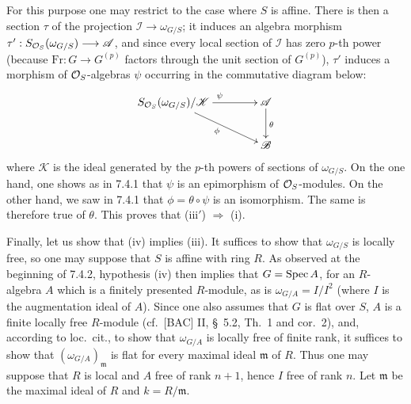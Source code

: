 For this purpose one may restrict to the case where $S$ is affine. There is then a section $\tau$ of the projection $\mathscr I\to\omega_{G/S}$; it induces an algebra morphism $\tau':S_{\mathcal{O}_S}(\omega_{G/S})\longrightarrow\mathscr A$, and since every local section of $\mathscr I$ has zero $p$-th power (because $\mathrm{Fr}:G\to G^{(p)}$ factors through the unit section of $G^{(p)}$), $\tau'$ induces a morphism of $\mathcal{O}_S$-algebras $\psi$ occurring in the commutative diagram below:
\[
\xymatrix@C=4em{S_{\OS}(\omega_{G/S})/\mathscr K\ar[r]^\psi\ar[dr]_\phi&\mathscr A\ar[d]^\theta\\&\mathscr B}
\]
where $\mathscr K$ is the ideal generated by the $p$-th powers of sections of $\omega_{G/S}$. On the one hand, one shows as in 7.4.1 that $\psi$ is an epimorphism of $\mathcal{O}_S$-modules. On the other hand, we saw in 7.4.1 that $\phi=\theta\circ\psi$ is an isomorphism. The same is therefore true of $\theta$. This proves that (iii$'$) $\Rightarrow$ (i).

Finally, let us show that (iv) implies (iii). It suffices to show that $\omega_{G/S}$ is locally free, so one may suppose that $S$ is affine with ring $R$. As observed at the beginning of 7.4.2, hypothesis (iv) then implies that $G=\operatorname{Spec} A$, for an $R$-algebra $A$ which is a finitely presented $R$-module, as is $\omega_{G/A}=I/I^2$ (where $I$ is the augmentation ideal of $A$). Since one also assumes that $G$ is flat over $S$, $A$ is a finite locally free $R$-module (cf.\ [BAC] II, \S~5.2, Th.\ 1 and cor.\ 2), and, according to loc.\ cit., to show that $\omega_{G/A}$ is locally free of finite rank, it suffices to show that $(\omega_{G/A})_{\mathfrak m}$ is flat for every maximal ideal $\mathfrak m$ of $R$. Thus one may suppose that $R$ is local and $A$ free of rank $n+1$, hence $I$ free of rank $n$. Let $\mathfrak m$ be the maximal ideal of $R$ and $k=R/\mathfrak m$.

